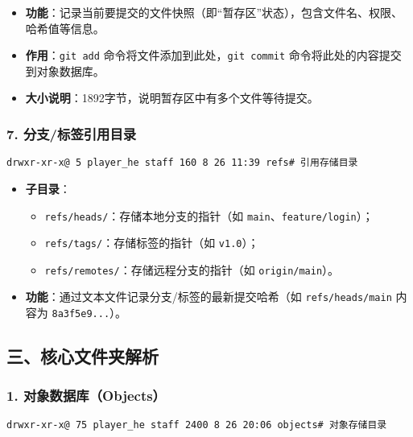 \begin{itemize}[leftmargin=*, nosep]
    \item \textbf{功能}：记录当前要提交的文件快照（即“暂存区”状态），包含文件名、权限、哈希值等信息。
    \item \textbf{作用}：\texttt{git add} 命令将文件添加到此处，\texttt{git commit} 命令将此处的内容提交到对象数据库。
    \item \textbf{大小说明}：1892字节，说明暂存区中有多个文件等待提交。
\end{itemize}

\subsubsection{7. 分支/标签引用目录}
\begin{verbatim}
drwxr-xr-x@ 5 player_he staff 160 8 26 11:39 refs# 引用存储目录
\end{verbatim}

\begin{itemize}[leftmargin=*, nosep]
    \item \textbf{子目录}：
    \begin{itemize}[leftmargin=*, nosep]
        \item \texttt{refs/heads/}：存储本地分支的指针（如 \texttt{main}、\texttt{feature/login}）；
        \item \texttt{refs/tags/}：存储标签的指针（如 \texttt{v1.0}）；
        \item \texttt{refs/remotes/}：存储远程分支的指针（如 \texttt{origin/main}）。
    \end{itemize}
    \item \textbf{功能}：通过文本文件记录分支/标签的最新提交哈希（如 \texttt{refs/heads/main} 内容为 \texttt{8a3f5e9...}）。
\end{itemize}


\subsection{三、核心文件夹解析}
\subsubsection{1. 对象数据库（Objects）}
\begin{verbatim}
drwxr-xr-x@ 75 player_he staff 2400 8 26 20:06 objects# 对象存储目录
\end{verbatim}

